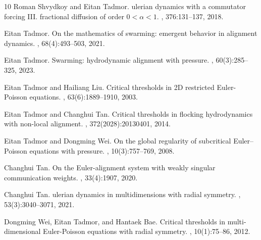 \documentclass[11pt,reqno]{amsart}
\theoremstyle{definition}
\theoremstyle{remark}
\begin{document}
\begin{thebibliography}{10}
		Roman Shvydkoy and Eitan Tadmor.
		ulerian dynamics with a commutator forcing {III}. fractional
		diffusion of order $0< \alpha< 1$.
		, 376:131--137, 2018.
		
		Eitan Tadmor.
		\newblock On the mathematics of swarming: emergent behavior in alignment
		dynamics.
		, 68(4):493--503, 2021.
		
		Eitan Tadmor.
		\newblock Swarming: hydrodynamic alignment with pressure.
		, 60(3):285--325,
		2023.
		
		Eitan Tadmor and Hailiang Liu.
		\newblock Critical thresholds in {2D} restricted {E}uler-{P}oisson equations.
		, 63(6):1889--1910, 2003.
		
		Eitan Tadmor and Changhui Tan.
		\newblock Critical thresholds in flocking hydrodynamics with non-local
		alignment.
		, 372(2028):20130401, 2014.
		
		Eitan Tadmor and Dongming Wei.
		\newblock On the global regularity of subcritical {E}uler--{P}oisson equations
		with pressure.
		, 10(3):757--769,
		2008.
		
		Changhui Tan.
		\newblock On the {E}uler-alignment system with weakly singular communication
		weights.
		, 33(4):1907, 2020.
		
		Changhui Tan.
		ulerian dynamics in multidimensions with radial symmetry.
		, 53(3):3040--3071, 2021.
		
		Dongming Wei, Eitan Tadmor, and Hantaek Bae.
		\newblock Critical thresholds in multi-dimensional {E}uler-{P}oisson equations
		with radial symmetry.
		, 10(1):75--86, 2012.
		
	\end{thebibliography}
	
	
	
	
	
\end{document}
